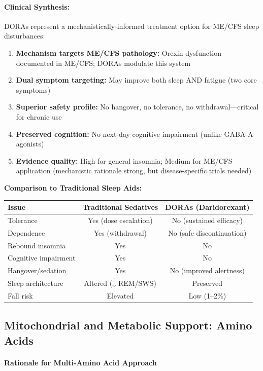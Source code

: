 \paragraph{Clinical Synthesis:}
DORAs represent a mechanistically-informed treatment option for ME/CFS sleep disturbances:
\begin{enumerate}
    \item \textbf{Mechanism targets ME/CFS pathology:} Orexin dysfunction documented in ME/CFS; DORAs modulate this system
    \item \textbf{Dual symptom targeting:} May improve both sleep AND fatigue (two core symptoms)
    \item \textbf{Superior safety profile:} No hangover, no tolerance, no withdrawal---critical for chronic use
    \item \textbf{Preserved cognition:} No next-day cognitive impairment (unlike GABA-A agonists)
    \item \textbf{Evidence quality:} High for general insomnia; Medium for ME/CFS application (mechanistic rationale strong, but disease-specific trials needed)
\end{enumerate}

\textbf{Comparison to Traditional Sleep Aids:}
\begin{center}
\begin{tabular}{lcc}
\toprule
\textbf{Issue} & \textbf{Traditional Sedatives} & \textbf{DORAs (Daridorexant)} \\
\midrule
Tolerance & Yes (dose escalation) & No (sustained efficacy) \\
Dependence & Yes (withdrawal) & No (safe discontinuation) \\
Rebound insomnia & Yes & No \\
Cognitive impairment & Yes & No \\
Hangover/sedation & Yes & No (improved alertness) \\
Sleep architecture & Altered (↓ REM/SWS) & Preserved \\
Fall risk & Elevated & Low (1--2\%) \\
\bottomrule
\end{tabular}
\end{center}

\subsection{Mitochondrial and Metabolic Support: Amino Acids}

\paragraph{Rationale for Multi-Amino Acid Approach}

